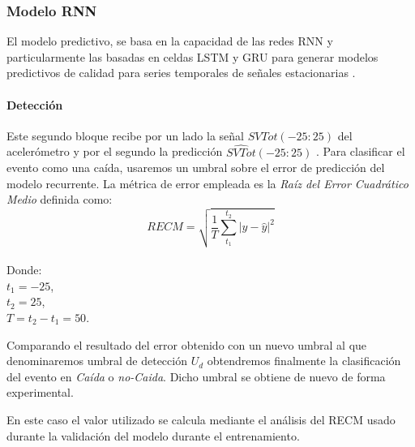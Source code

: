 \subsubsection{Modelo RNN}


El modelo predictivo, se basa en la capacidad de las redes RNN y particularmente las basadas en celdas LSTM y GRU para generar modelos predictivos de calidad para series temporales de señales estacionarias \cite{Qin2019}.






\paragraph*{Detección}

Este segundo bloque recibe por un lado la señal $SVTot(-25:25)$ del acelerómetro y por el segundo la predicción $\hat{SVTot}(-25:25)$ . Para clasificar el evento como una caída, usaremos un umbral sobre el error de predicción del modelo recurrente. La métrica de error empleada es la \textit{Raíz del Error Cuadrático Medio} definida como: \[
  RECM=\sqrt{\frac{1}{T}\sum_{t_1}^{t_2}|y-\hat{y}|^2 }
\]\\
Donde:\\
$t_1 = -25$,\\
$t_2 = 25$,\\
$T=t_2-t_1=50$.

Comparando el resultado del error obtenido con un nuevo umbral al que denominaremos umbral de detección $U_{d}$ obtendremos finalmente la clasificación del evento en \textit{Caída} o \textit{no-Caida}. Dicho umbral se obtiene de nuevo de forma experimental.

En este caso el valor utilizado se calcula mediante el análisis del RECM usado durante la validación del modelo durante el entrenamiento. 

